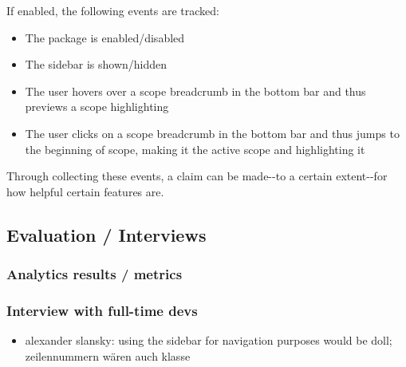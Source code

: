 If enabled, the following events are tracked:

\begin{itemize}
\itemsep1pt\parskip0pt
\item
  The package is enabled/disabled
\item
  The sidebar is shown/hidden
\item
  The user hovers over a scope breadcrumb in the bottom bar and thus
  previews a scope highlighting
\item
  The user clicks on a scope breadcrumb in the bottom bar and thus jumps
  to the beginning of scope, making it the active scope and highlighting
  it
\end{itemize}

Through collecting these events, a claim can be made-{}-to a certain
extent-{}-for how helpful certain features are.

\subsection{Evaluation / Interviews}\label{evaluation-interviews}

\subsubsection{Analytics results /
metrics}\label{analytics-results-metrics}

\subsubsection{Interview with full-time
devs}\label{interview-with-full-time-devs}

\begin{itemize}
\itemsep1pt\parskip0pt
\item
  alexander slansky: using the sidebar for navigation purposes would be
  doll; zeilennummern wären auch klasse
\end{itemize}
